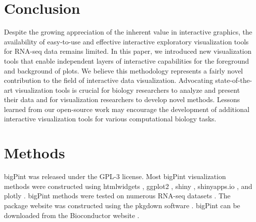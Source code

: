 \documentclass[parskip=full]{bmcart}
\begin{document}
\section*{Conclusion}

Despite the growing appreciation of the inherent value in interactive graphics, the availability of easy-to-use and effective interactive exploratory visualization tools for RNA-seq data remains limited. In this paper, we introduced new visualization tools that enable independent layers of interactive capabilities for the foreground and background of plots. We believe this methodology represents a fairly novel contribution to the field of interactive data visualization. Advocating state-of-the-art visualization tools is crucial for biology researchers to analyze and present their data and for visualization researchers to develop novel methods. Lessons learned from our open-source work may encourage the development of additional interactive visualization tools for various computational biology tasks.

\section*{Methods}

bigPint was released under the GPL-3 license. Most bigPint visualization methods were constructed using htmlwidgets \cite{htmlwidgets}, ggplot2 \cite{ggplot2}, shiny \cite{shiny}, shinyapps.io \cite{rstudio}, and plotly \cite{plotly}. bigPint methods were tested on numerous RNA-seq datasets \cite{rutter1, rutter2}. The package website was constructed using the pkgdown software \cite{pkgdown}. bigPint can be downloaded from the Bioconductor website \cite{gentleman2004bioconductor}. 

\end{document}
